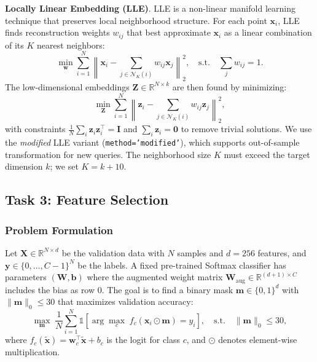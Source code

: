 \documentclass[onecolumn,a4paper,12pt]{IEEEtran}
\begin{document}
\textbf{Locally Linear Embedding (LLE)}. LLE is a non-linear manifold learning technique that preserves local neighborhood structure. For each point $\mathbf{x}_i$, LLE finds reconstruction weights $w_{ij}$ that best approximate $\mathbf{x}_i$ as a linear combination of its $K$ nearest neighbors:
\begin{equation}
\min_{\mathbf{w}} \sum_{i=1}^{N} \left\| \mathbf{x}_i - \sum_{j \in \mathcal{N}_K(i)} w_{ij} \mathbf{x}_j \right\|_2^2, \quad \text{s.t.} \quad \sum_{j} w_{ij} = 1.
\end{equation}
The low-dimensional embeddings $\mathbf{Z} \in \mathbb{R}^{N \times k}$ are then found by minimizing:
\begin{equation}
\min_{\mathbf{Z}} \sum_{i=1}^{N} \left\| \mathbf{z}_i - \sum_{j \in \mathcal{N}_K(i)} w_{ij} \mathbf{z}_j \right\|_2^2,
\end{equation}
with constraints $\frac{1}{N} \sum_i \mathbf{z}_i \mathbf{z}_i^{\top} = \mathbf{I}$ and $\sum_i \mathbf{z}_i = \mathbf{0}$ to remove trivial solutions. We use the \textit{modified} LLE variant (\texttt{method='modified'}), which supports out-of-sample transformation for new queries. The neighborhood size $K$ must exceed the target dimension $k$; we set $K = k + 10$.

\subsection{Task 3: Feature Selection}

\subsubsection{Problem Formulation}

Let $\mathbf{X} \in \mathbb{R}^{N \times d}$ be the validation data with $N$ samples and $d=256$ features, and $\mathbf{y} \in \{0, \dots, C-1\}^N$ be the labels. A fixed pre-trained Softmax classifier has parameters $(\mathbf{W}, \mathbf{b})$ where the augmented weight matrix $\mathbf{W}_{\text{aug}} \in \mathbb{R}^{(d+1) \times C}$ includes the bias as row 0. The goal is to find a binary mask $\mathbf{m} \in \{0,1\}^d$ with $\|\mathbf{m}\|_0 \leq 30$ that maximizes validation accuracy:
\begin{equation}
\max_{\mathbf{m}} \; \frac{1}{N} \sum_{i=1}^{N} \mathbb{1}\left[\arg\max_{c} \; f_c(\mathbf{x}_i \odot \mathbf{m}) = y_i\right], \quad \text{s.t.} \quad \|\mathbf{m}\|_0 \leq 30,
\end{equation}
where $f_c(\tilde{\mathbf{x}}) = \mathbf{w}_c^{\top} \tilde{\mathbf{x}} + b_c$ is the logit for class $c$, and $\odot$ denotes element-wise multiplication.
\end{document}
